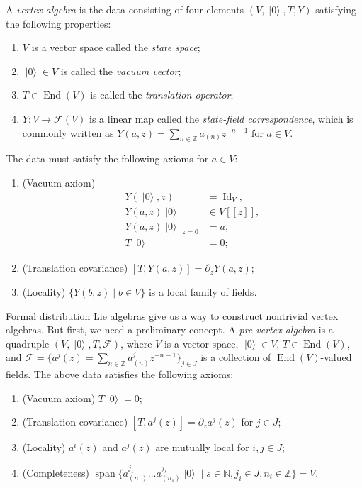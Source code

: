 \documentclass[a4paper, 12pt, reqno]{amsart}
\theoremstyle{remark}
\DeclareMathOperator{\vac}{|0\rangle}
\DeclareMathOperator{\vspan}{span}
\DeclareMathOperator{\End}{End}
\DeclareMathOperator{\Id}{Id}
\begin{document}
A \emph{vertex algebra} is the data consisting of four elements $(V, \vac, T, Y)$ satisfying the following properties:
\begin{enumerate}
\item $V$ is a vector space called the \emph{state space};
\item $\vac \in V$ is called the \emph{vacuum vector};
\item $T \in \End(V)$ is called the \emph{translation operator};
\item $Y: V \to \mathcal{F}(V)$ is a linear map called the \emph{state-field correspondence}, which is commonly written as $Y(a, z) = \sum_{n \in \mathbb{Z}}a_{(n)}z^{-n - 1}$ for $a \in V$.
\end{enumerate}
The data must satisfy the following axioms for $a \in V$:
\begin{enumerate}
\item (Vacuum axiom)
  \begin{align*}
    Y(\vac,z) &= \Id_V, \\
    Y(a, z)\vac &\in V[[z]], \\
    Y(a, z)\vac|_{z = 0} &= a, \\
    T\vac &= 0;
  \end{align*}
\item (Translation covariance) $[T, Y(a, z)] = \partial_zY(a, z)$;
\item (Locality) $\{Y(b, z) \mid b \in V\}$ is a local family of fields.
\end{enumerate}

Formal distribution Lie algebras give us a way to construct nontrivial vertex algebras.
But first, we need a preliminary concept.
A \emph{pre-vertex algebra} is a quadruple $(V, \vac, T, \mathcal{F})$, where $V$ is a vector space, $\vac \in V$, $T \in \End(V)$, and $\mathcal{F} = \{a^j(z) = \sum_{n \in \mathbb{Z}}a^j_{(n)}z^{-n - 1}\}_{j \in J}$ is a collection of $\End(V)$-valued fields.
The above data satisfies the following axioms:
\begin{enumerate}
\item (Vacuum axiom) $T\vac = 0$;
\item (Translation covariance) $[T, a^j(z)] = \partial_za^j(z)$ for $j \in J$;
\item (Locality) $a^i(z)$ and $a^j(z)$ are mutually local for $i, j \in J$;
\item (Completeness) $\vspan\{a^{j_1}_{(n_1)}\dots a^{j_s}_{(n_s)}\vac \mid s \in \mathbb{N}, j_i \in J, n_i \in \mathbb{Z}\} = V$.
\end{enumerate}
\end{document}
